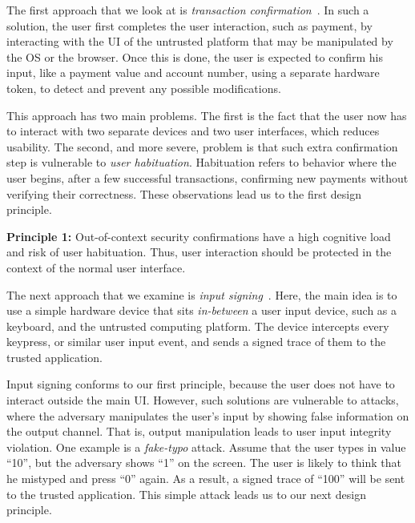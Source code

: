 The first approach that we look at is \emph{transaction confirmation}~\cite{filyanov2011uni}. In such a solution, the user first completes the user interaction, such as payment, by interacting with the UI of the untrusted platform that may be manipulated by the OS or the browser. Once this is done, the user is expected to confirm his input, like a payment value and account number, using a separate hardware token, to detect and prevent any possible modifications.

This approach has two main problems. The first is the fact that the user now has to interact with two separate devices and two user interfaces, which reduces usability. The second, and more severe, problem is that such extra confirmation step is vulnerable to \emph{user habituation}. Habituation refers to behavior where the user begins, after a few successful transactions, confirming new payments without verifying their correctness. These observations lead us to the first design principle.  

\begin{tcolorbox}
\textbf{Principle 1:} Out-of-context security confirmations have a high cognitive load and risk of user habituation. Thus, user interaction should be protected in the context of the normal user interface.
\end{tcolorbox}

The next approach that we examine is \emph{input signing}~\cite{IntegriKey}. Here, the main idea is to use a simple hardware device that sits \emph{in-between} a user input device, such as a keyboard, and the untrusted computing platform. The device intercepts every keypress, or similar user input event, and sends a signed trace of them to the trusted application. %

Input signing conforms to our first principle, because the user does not have to interact outside the main UI. However, such solutions are vulnerable to attacks, where the adversary manipulates the user's input by showing false information on the output channel. That is, output manipulation leads to user input integrity violation. One example is a \emph{fake-typo} attack. Assume that the user types in value ``10'', but the adversary shows ``1'' on the screen. The user is likely to think that he mistyped and press ``0'' again. As a result, a signed trace of ``100'' will be sent to the trusted application. This simple attack leads us to our next design principle.


